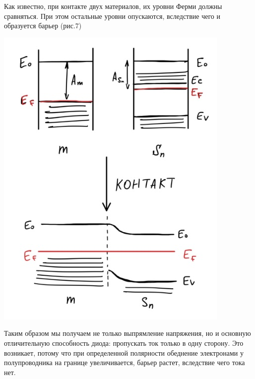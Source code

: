 \documentclass[a4paper]{article}
\begin{document}
Как известно, при контакте двух материалов, их уровни Ферми должны сравняться. При этом остальные уровни опускаются, вследствие чего и образуется барьер (рис.7)
\begin{center}
    \includegraphics[scale = 0.7]{barrier.jpg}
\end{center}
Таким образом мы получаем не только выпрямление напряжения, но и основную отличительную способность диода: пропускать ток только в одну сторону. Это возникает, потому что при определенной полярности обеднение электронами у полупроводника на границе увеличивается, барьер растет, вследствие чего тока нет.
\end{document}
